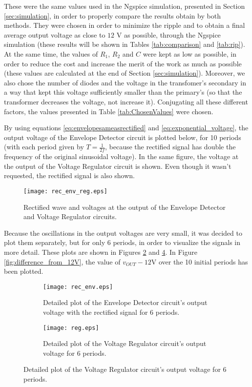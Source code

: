  These were the same values used in the Ngspice simulation, presented in Section \ref{sec:simulation}, in order to properly compare the results obtain by both methods. They were chosen in order to minimize the ripple and to obtain a final average output voltage as close to $12$ V as possible, through the Ngspice simulation (these results will be shown in Tables \ref{tab:comparison} and \ref{tab:rip}). At the same time, the values of $R_1$, $R_2$ and $C$ were kept as low as possible, in order to reduce the cost and increase the merit of the work as much as possible (these values are calculated at the end of Section \ref{sec:simulation}). Moreover, we also chose the number of diodes and the voltage in the transfomer's secondary in a way that kept this voltage sufficiently smaller than the primary's (so that the transformer decreases the voltage, not increase it). Conjugating all these different factors, the values presented in Table \ref{tab:ChosenValues} were chosen.
\par
By using equations \ref{eq:envelopesameasrectified} and \ref{eq:exponential_voltage}, the output voltage of the Envelope Detector circuit is plotted below, for 10 periods (with each period given by $T=\frac{1}{2f}$, because the rectified signal has double the frequency of the original sinusoidal voltage). In the same figure, the voltage at the output of the Voltage Regulator circuit is shown. Even though it wasn't requested, the rectified signal is also shown.


\begin{figure}[H] \centering
  \texttt{[image: rec\_env\_reg.eps]}
  \caption{Rectified wave and voltages at the output of the Envelope Detector and Voltage Regulator circuits.}
  \label{fig:rectified_envelope_regulator_voltages}
\end{figure}

Because the oscillations in the output voltages are very small, it was decided to plot them separately, but for only 6 periods, in order to visualize the signals in more detail. These plots are shown in Figures \ref{fig:rectified_envelope_voltage} and \ref{fig:regulator_voltage}. In Figure \ref{fig:difference_from_12V}, the value of $v_{OUT}-12$V over the 10 initial periods has been plotted.

\begin{figure}[H]
  \begin{subfigure}{.49\linewidth}
    \centering
    \texttt{[image: rec\_env.eps]}
    \footnotesize
    \caption{Detailed plot of the Envelope Detector circuit's output voltage with the rectified signal for 6 periods.}
    \label{fig:rectified_envelope_voltage}
  \end{subfigure}
  \hspace{5mm}
  \begin{subfigure}{.49\linewidth}
    \centering
    \texttt{[image: reg.eps]}  
    \caption{Detailed plot of the Voltage Regulator circuit's output voltage for 6 periods.}
    \label{fig:regulator_voltage}
  \end{subfigure}
\end{figure}

